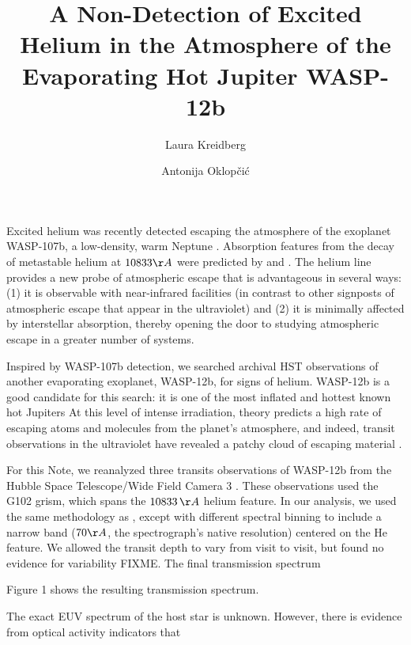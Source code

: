 \documentclass[RNAAS]{aastex62}
\begin{document}
\title{A Non-Detection of Excited Helium in the Atmosphere of the Evaporating Hot Jupiter WASP-12b}


\author{Laura Kreidberg}

\author{Antonija Oklop\v{c}i\'{c}}
Excited helium was recently detected escaping the atmosphere of the exoplanet WASP-107b, a low-density, warm Neptune \citep{spake18}. Absorption features from the decay of metastable helium at $10833\AA$ were predicted by \cite{seager00} and \cite{oklopcic18}. The helium line provides a new probe of atmospheric escape that is advantageous in several ways: (1) it is observable with near-infrared facilities (in contrast to other signposts of atmospheric escape that appear in the ultraviolet) and (2) it is minimally affected by interstellar absorption, thereby opening the door to studying atmospheric escape in a greater number of systems.

Inspired by WASP-107b detection, we searched archival HST observations of another evaporating exoplanet, WASP-12b, for signs of helium. WASP-12b is a good candidate for this search: it is one of the most inflated and hottest known hot Jupiters \citep[$R_p = 1.79\,R_\mathrm{J}$, $T_\mathrm{eq} = 2500$ K][]{hebb09} At this level of intense irradiation, theory predicts a high rate of escaping atoms and molecules from the planet's atmosphere, and indeed, transit observations in the ultraviolet have revealed a patchy cloud of escaping material \citep{haswell12, nichols15}.  

For this Note, we reanalyzed three transits observations of WASP-12b from the
Hubble Space Telescope/Wide Field Camera 3 \citep[originally published in
][]{kreidberg15b}. These observations used the G102 grism, which spans the
$10833\,\AA$ helium feature. In our analysis, we used the same methodology as \cite{kreidberg15b}, except with different spectral binning to include a narrow band ($70\AA$, the spectrograph's native resolution) centered on the He feature.  
We allowed the transit depth to vary from visit to visit, but found no evidence
for variability FIXME. The final transmission spectrum

Figure 1 shows the resulting transmission spectrum. 

The exact EUV spectrum of the host star is unknown. However, there is evidence
from optical activity indicators that
\end{document}
